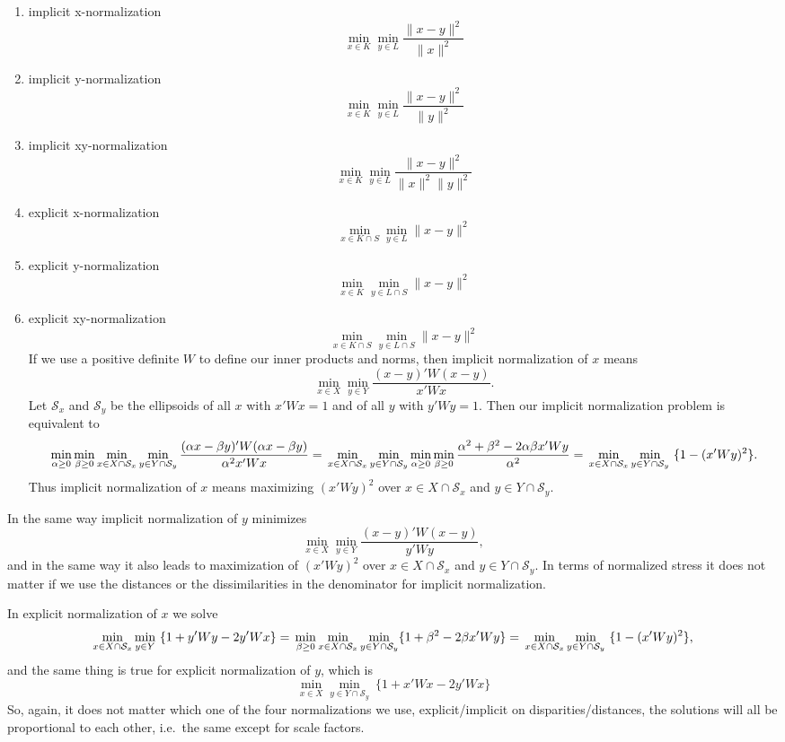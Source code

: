 \documentclass[
  12pt,
  letterpaper,
  DIV=11,
  numbers=noendperiod]{scrreprt}
\theoremstyle{remark}
\begin{document}
\begin{enumerate}
\def\labelenumi{\arabic{enumi}.}
\item
  implicit x-normalization \[
  \min_{x\in K}\min_{y\in L}\frac{\|x-y\|^2}{\|x\|^2}
  \]
\item
  implicit y-normalization \[
  \min_{x\in K}\min_{y\in L}\frac{\|x-y\|^2}{\|y\|^2}
  \]
\item
  implicit xy-normalization \[
  \min_{x\in K}\min_{y\in L}\frac{\|x-y\|^2}{\|x\|^2\|y\|^2}
  \]
\item
  explicit x-normalization \[
  \min_{x\in K\cap S}\min_{y\in L}\|x-y\|^2
  \]
\item
  explicit y-normalization \[
  \min_{x\in K}\min_{y\in L\cap S}\|x-y\|^2
  \]
\item
  explicit xy-normalization \[
  \min_{x\in K\cap S}\min_{y\in L\cap S}\|x-y\|^2
  \] If we use a positive definite \(W\) to define our inner products
  and norms, then implicit normalization of \(x\) means \[
  \min_{x\in X}\min_{y\in Y}\frac{(x-y)'W(x-y)}{x'Wx}.
  \] Let \(\mathcal{S}_x\) and \(\mathcal{S}_y\) be the ellipsoids of
  all \(x\) with \(x'Wx=1\) and of all \(y\) with \(y'Wy=1\). Then our
  implicit normalization problem is equivalent to \[
  \min_{\alpha\geq 0}\min_{\beta\geq 0}\min_{x\in X\cap\mathcal{S}_x}\min_{y\in Y\cap\mathcal{S}_y}\frac{(\alpha x-\beta y)'W(\alpha x-\beta y)}{\alpha^2 x'Wx}=\\\min_{x\in X\cap\mathcal{S}_x}\min_{y\in Y\cap\mathcal{S}_y}\min_{\alpha\geq 0}\min_{\beta\geq 0}\frac{\alpha^2+\beta^2-2\alpha\beta x'Wy}{\alpha^2}=\\
  \min_{x\in X\cap\mathcal{S}_x}\min_{y\in Y\cap\mathcal{S}_y}\ \{1-(x'Wy)^2\}.
  \] Thus implicit normalization of \(x\) means maximizing \((x'Wy)^2\)
  over \(x\in X\cap\mathcal{S}_x\) and \(y\in Y\cap\mathcal{S}_y.\)
\end{enumerate}

In the same way implicit normalization of \(y\) minimizes \[
\min_{x\in X}\min_{y\in Y}\frac{(x-y)'W(x-y)}{y'Wy},
\] and in the same way it also leads to maximization of \((x'Wy)^2\)
over \(x\in X\cap\mathcal{S}_x\) and \(y\in Y\cap\mathcal{S}_y.\) In
terms of normalized stress it does not matter if we use the distances or
the dissimilarities in the denominator for implicit normalization.

In explicit normalization of \(x\) we solve \[
\min_{x\in X\cap\mathcal{S}_x}\min_{y\in Y}\ \{1+y'Wy-2y'Wx\}=\\
\min_{\beta\geq 0}\min_{x\in X\cap\mathcal{S}_x}\min_{y\in Y\cap\mathcal{S}_y}\{1+\beta^2-2\beta x'Wy\}
=\\\min_{x\in X\cap\mathcal{S}_x}\min_{y\in Y\cap\mathcal{S}_y}\ \{1-(x'Wy)^2\},
\] and the same thing is true for explicit normalization of \(y\), which
is \[
\min_{x\in X}\min_{y\in Y\cap\mathcal{S}_y}\ \{1+x'Wx-2y'Wx\}
\] So, again, it does not matter which one of the four normalizations we
use, explicit/implicit on disparities/distances, the solutions will all
be proportional to each other, i.e.~the same except for scale factors.
\end{document}
